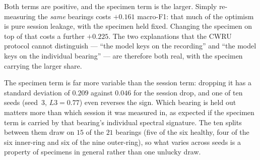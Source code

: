 \documentclass[preprint,12pt]{elsarticle}
\begin{document}
\begin{table}[t]
\centering
\caption{Decomposing the optimism, and the same decomposition with the rig tone
removed. One training set (files 1--4 of five bearings per class, first $70\%$
of windows) is evaluated on three test sets that differ by exactly one factor
each: L2 moves only the recording session, L3 moves the specimen as well. Same
condition, epochs and seeds as Table~\ref{tab:pb_leak}; the \emph{no filter}
column is that table's two endpoints. In the last two columns every window is
masked in the frequency domain and renormalized before training, and the whole
procedure is repeated from scratch: the notch removes $100$\,Hz and its first
twenty harmonics with $\pm2$ bins each, and the high-pass is the $2$\,kHz
control of Table~\ref{tab:bench}.}
\label{tab:pb_levels}
\small
{}
\end{table}

Both terms are positive, and the specimen term is the larger. Simply
re-measuring the \emph{same} bearings costs $+0.161$ macro-F1: that much
of the optimism is pure session leakage, with the specimen held fixed. Changing
the specimen on top of that costs a further $+0.225$. The two explanations that
the CWRU protocol cannot distinguish --- ``the model keys on the recording'' and
``the model keys on the individual bearing'' --- are therefore both real, with
the specimen carrying the larger share.

The specimen term is far more variable than the session term: dropping it has a standard deviation of $0.209$ against
$0.046$ for the session drop, and one of ten seeds (seed~3, $L3 = 0.77$) even
reverses the sign. Which bearing is held out matters more than which session it
was measured in, as expected if the specimen term is carried by that
bearing's individual spectral signature. The ten splits between them draw on
$15$ of the $21$ bearings (five of the six healthy, four of the six inner-ring
and six of the nine outer-ring), so what varies across seeds is a property of
specimens in general rather than one unlucky draw.
\end{document}
